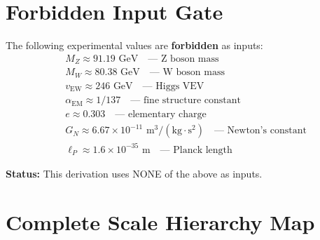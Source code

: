 \documentclass[11pt,a4paper]{article}
\theoremstyle{definition}
\begin{document}
\section{Forbidden Input Gate}
\label{sec:forbidden}

\begin{lockbox}
The following experimental values are \textbf{forbidden} as inputs:
\begin{align}
\label{eq:forbidden_MZ}
&M_Z \approx 91.19 \text{ GeV} \quad \text{— Z boson mass} \\
\label{eq:forbidden_MW}
&M_W \approx 80.38 \text{ GeV} \quad \text{— W boson mass} \\
\label{eq:forbidden_vEW}
&v_{\text{EW}} \approx 246 \text{ GeV} \quad \text{— Higgs VEV} \\
\label{eq:forbidden_alpha}
&\alpha_{\text{EM}} \approx 1/137 \quad \text{— fine structure constant} \\
\label{eq:forbidden_e}
&e \approx 0.303 \quad \text{— elementary charge} \\
\label{eq:forbidden_GN}
&G_N \approx 6.67 \times 10^{-11} \text{ m}^3/(\text{kg}\cdot\text{s}^2) \quad \text{— Newton's constant} \\
\label{eq:forbidden_lP}
&\ell_P \approx 1.6 \times 10^{-35} \text{ m} \quad \text{— Planck length}
\end{align}

\textbf{Status:} This derivation uses NONE of the above as inputs.
\end{lockbox}

\section{Complete Scale Hierarchy Map}
\label{sec:scale_map}
\end{document}
